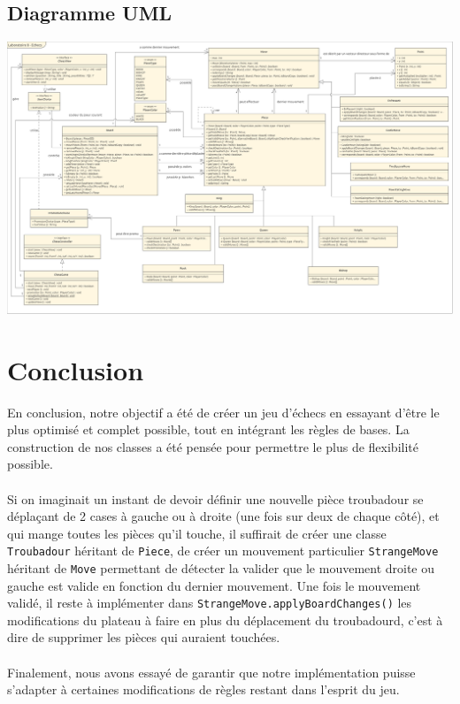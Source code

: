 \documentclass[12pt]{article}
\begin{document}
\begin{landscape}
\thispagestyle{empty}
\newpage
\section{Diagramme UML}
\includegraphics[width=27cm]{uml.png}
\newpage
\end{landscape}

\section{Conclusion}

En conclusion, notre objectif a été de créer un jeu d'échecs en essayant d'être le plus optimisé et complet possible, tout en intégrant les règles de bases. La construction de nos classes a été pensée pour permettre le plus de flexibilité possible. \\
\\Si on imaginait un instant de devoir définir une nouvelle pièce troubadour se déplaçant de 2 cases à gauche ou à droite (une fois sur deux de chaque côté), et qui mange toutes les pièces qu'il touche, il suffirait de créer une classe \texttt{Troubadour} héritant de \texttt{Piece}, de créer un mouvement particulier \texttt{StrangeMove} héritant de \texttt{Move} permettant de détecter la valider que le mouvement droite ou gauche est valide en fonction du dernier mouvement. Une fois le mouvement validé, il reste à implémenter dans \texttt{StrangeMove.applyBoardChanges()} les modifications du plateau à faire en plus du déplacement du troubadourd, c'est à dire de supprimer les pièces qui auraient touchées.\\
\\Finalement, nous avons essayé de garantir que notre implémentation puisse s'adapter à certaines modifications de règles restant dans l'esprit du jeu.
\end{document}
